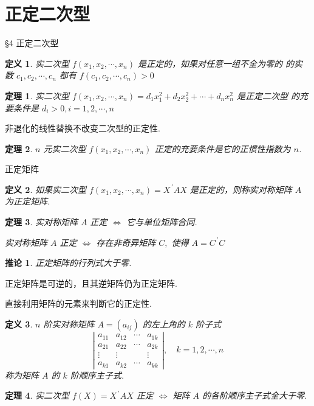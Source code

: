 \documentclass[13pt]{beamer}
\newtheorem{thm}{定理}
\newtheorem*{defi}{定义}
\newtheorem*{coro}{推论}
\begin{document}
\section{正定二次型}
\begin{frame}{\S 4 正定二次型}
\begin{defi}
实二次型 $f\left(x_{1}, x_{2}, \cdots, x_{n}\right)$ 是正定的，如果对任意一组不全为零的
的实数 $c_{1}, c_{2}, \cdots, c_{n}$ 都有 $f\left(c_{1}, c_{2}, \cdots, c_{n}\right)>0$
\end{defi}

\begin{thm}
实二次型 $f\left(x_{1}, x_{2}, \cdots, x_{n}\right)=d_{1} x_{1}^{2}+d_{2} x_{2}^{2}+\cdots+d_{n} x_{n}^{2}$ 是正定二次型
的充要条件是 $d_{i}>0, i=1,2, \cdots, n$
\end{thm}

非退化的线性替换不改变二次型的正定性.
\begin{thm}
 ${n}$ 元实二次型 $f\left(x_{1}, x_{2}, \cdots, x_{n}\right)$ 正定的充要条件是它的正惯性指数为 $n$.
\end{thm}
\end{frame}

\begin{frame}{正定矩阵}
\begin{defi}
如果实二次型 $f\left(x_{1}, x_{2}, \cdots, x_{n}\right)=X^{\, \prime} A X$ 是正定的，则称实对称矩阵
$A$ 为正定矩阵.
\end{defi}
\begin{thm}
实对称矩阵 $A$ 正定 $\Leftrightarrow$ 它与单位矩阵合同. 

实对称矩阵 $A$ 正定 $\Leftrightarrow$  存在非奇异矩阵 ${C},$ 使得 $A=C^{\, \prime} C$
\end{thm}



\begin{coro}
正定矩阵的行列式大于零. 
\end{coro}

正定矩阵是可逆的，且其逆矩阵仍为正定矩阵. 
\end{frame}

\begin{frame}
直接利用矩阵的元素来判断它的正定性. 

\begin{defi}
$n$ 阶实对称矩阵 ${A}=\left({a}_{i j}\right)$ 的左上角的 ${k}$ 阶子式
\[
\left|\begin{array}{cccc}
a_{11} & a_{12} & \cdots & a_{1 k} \\
a_{21} & a_{22} & \cdots & a_{2 k} \\
\vdots & \vdots &  & \vdots \\
a_{k 1} & a_{k 2} & \cdots & a_{k k}
\end{array}\right|, \quad k=1,2, \cdots, n
\]
称为矩阵 $A$ 的 $k$ 阶顺序主子式. 
\end{defi}
\begin{thm}
实二次型 $f(X)=X^{\, \prime} A X$ 正定
$\Leftrightarrow$
矩阵 $A$ 的各阶顺序主子式全大于零. 
\end{thm}
\end{frame}
\end{document}
